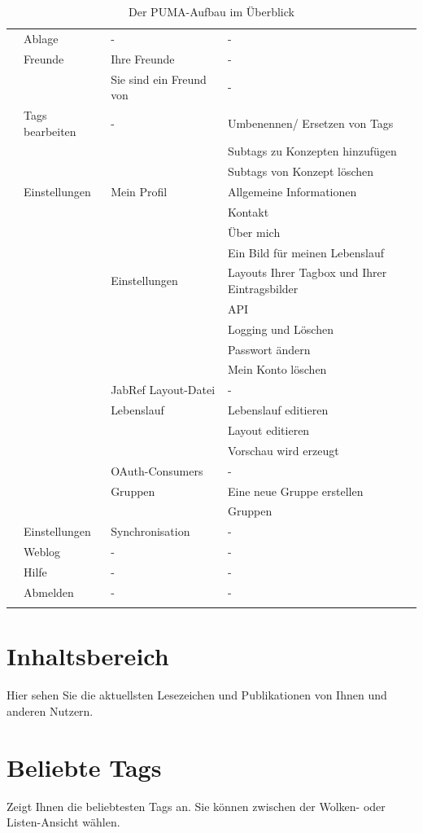 \begin{longtabu}{|X[l]|X[l]|X[l]|X[l]|}
&Ablage&-&-\\ 
&Freunde&Ihre Freunde&- \\ 
&&Sie sind ein Freund von&- \\ 
&Tags bearbeiten&-&Umbenennen/ Ersetzen von Tags\\ 
&&&Subtags zu Konzepten hinzufügen\\ 
&&&Subtags von Konzept löschen\\ 
&Einstellungen&Mein Profil&Allgemeine Informationen\\ 
&&&Kontakt\\ 
&&&Über mich\\ 
&&&Ein Bild für meinen Lebenslauf\\
&&Einstellungen&Layouts Ihrer Tagbox und Ihrer Eintragsbilder\\
&&&API\\
&&&Logging und Löschen\\
&&&Passwort ändern\\
&&&Mein Konto löschen\\
&&JabRef Layout-Datei&-\\
&&Lebenslauf& Lebenslauf editieren\\
&&&Layout editieren\\ 
&&&Vorschau wird erzeugt\\
&&OAuth-Consumers&- \\
&&Gruppen&Eine neue Gruppe erstellen\\
&&&Gruppen\\
&Einstellungen&Synchronisation&-\\
&Weblog&-&-\\
&Hilfe&-&-\\
&Abmelden&-&-\\\hline
\caption{Der PUMA-Aufbau im Überblick}
\end{longtabu}


\section{Inhaltsbereich}
Hier sehen Sie die aktuellsten Lesezeichen und Publikationen von Ihnen und anderen Nutzern. 
\section{Beliebte Tags}
Zeigt Ihnen die beliebtesten Tags an. Sie können zwischen der Wolken- oder Listen-Ansicht wählen.